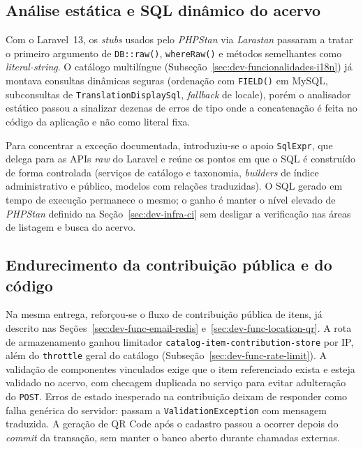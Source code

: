\subsection{Análise estática e SQL dinâmico do acervo}\label{sec:dev-laravel13-phpstan}

Com o Laravel~13, os \textit{stubs} usados pelo \textit{PHPStan} via \textit{Larastan} passaram a tratar o primeiro argumento de \texttt{DB::raw()}, \texttt{whereRaw()} e métodos semelhantes como \textit{literal-string}. O catálogo multilíngue (Subseção~\ref{sec:dev-funcionalidades-i18n}) já montava consultas dinâmicas seguras (ordenação com \texttt{FIELD()} em MySQL, subconsultas de \texttt{TranslationDisplaySql}, \textit{fallback} de locale), porém o analisador estático passou a sinalizar dezenas de erros de tipo onde a concatenação é feita no código da aplicação e não como literal fixa.

Para concentrar a exceção documentada, introduziu-se o apoio \texttt{SqlExpr}, que delega para as APIs \textit{raw} do Laravel e reúne os pontos em que o SQL é construído de forma controlada (serviços de catálogo e taxonomia, \textit{builders} de índice administrativo e público, modelos com relações traduzidas). O SQL gerado em tempo de execução permanece o mesmo; o ganho é manter o nível elevado de \textit{PHPStan} definido na Seção~\ref{sec:dev-infra-ci} sem desligar a verificação nas áreas de listagem e busca do acervo.


\subsection{Endurecimento da contribuição pública e do código}\label{sec:dev-laravel13-hardening}

Na mesma entrega, reforçou-se o fluxo de contribuição pública de itens, já descrito nas Seções~\ref{sec:dev-func-email-redis} e~\ref{sec:dev-func-location-qr}. A rota de armazenamento ganhou limitador \texttt{catalog-item-contribution-store} por IP, além do \texttt{throttle} geral do catálogo (Subseção~\ref{sec:dev-func-rate-limit}). A validação de componentes vinculados exige que o item referenciado exista e esteja validado no acervo, com checagem duplicada no serviço para evitar adulteração do \texttt{POST}. Erros de estado inesperado na contribuição deixam de responder como falha genérica do servidor: passam a \texttt{ValidationException} com mensagem traduzida. A geração de QR Code após o cadastro passou a ocorrer depois do \textit{commit} da transação, sem manter o banco aberto durante chamadas externas.

